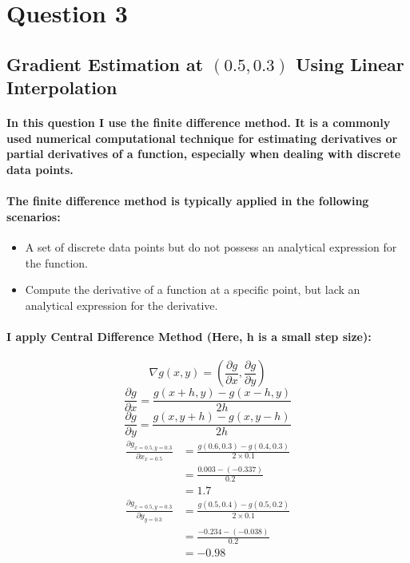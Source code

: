 \section{Question 3}
\subsection{Gradient Estimation at $(0.5, 0.3)$ Using Linear Interpolation}
\paragraph{In this question I use the \textbf{finite difference method}. It is a commonly used numerical computational technique for estimating derivatives or partial derivatives of a function, especially when dealing with discrete data points.}
% 
% 
\paragraph{The finite difference method is typically applied in the following scenarios:}
% 
% 
\begin{itemize}
    \item A set of discrete data points but do not possess an analytical expression for the function.
    \item Compute the derivative of a function at a specific point, but lack an analytical expression for the derivative.
\end{itemize}
% 
\paragraph{I apply Central Difference Method (Here, h is a small step size):}
% 
% 
% 
\begin{equation}
    \nabla g(x,y)=(\frac{\partial g}{\partial x},\frac{\partial g}{\partial y})
\end{equation}
% 
% 
\begin{equation}
    \frac{\partial g}{\partial x}=\frac{g(x+h,y)-g(x-h,y)}{2 h}
\end{equation}
% 
% 
\begin{equation}
    \frac{\partial g}{\partial y}=\frac{g(x,y+h)-g(x,y-h)}{2 h}
\end{equation}
% 
% 
% 
% 
% 
\begin{align*}
    \frac{\partial g_{x=0.5, y=0.3}}{\partial x_{x=0.5}} & = \frac{g(0.6,0.3)-g(0.4,0.3)}{2 \times 0.1} \\
                                                         & = \frac{0.003-(-0.337)}{0.2}                 \\
                                                         & =1.7
\end{align*}
% 
% 
% 
\begin{align*}
    \frac{\partial g_{x=0.5, y=0.3}}{\partial y_{y=0.3}} & = \frac{g(0.5,0.4)-g(0.5,0.2)}{2 \times 0.1} \\
                                                         & = \frac{-0.234-(-0.038)}{0.2}                \\
                                                         & = -0.98
\end{align*}
% 
% 
% 
